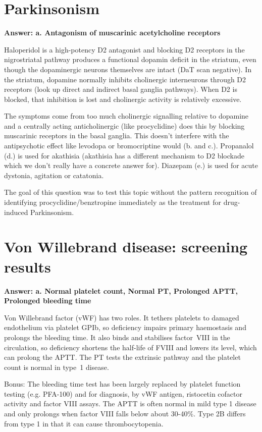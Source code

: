 \documentclass{article}
\begin{document}
\section{Parkinsonism}

\textbf{Answer: a. Antagonism of muscarinic acetylcholine receptors}

Haloperidol is a high-potency D2 antagonist and blocking D2 receptors in the nigrostriatal pathway produces a functional dopamin deficit in the striatum, even though the dopaminergic neurons themselves are intact (DaT scan negative). In the striatum, dopamine normally inhibits cholinergic interneurons through D2 receptors (look up direct and indirect basal ganglia pathways). When D2 is blocked, that inhibition is lost and cholinergic activity is relatively excessive. 

The symptoms come from too much cholinergic signalling relative to dopamine and a centrally acting anticholinergic (like procyclidine) does this by blocking muscarinic receptors in the basal ganglia. This doesn't interfere with the antipsychotic effect like levodopa or bromocriptine would (b. and c.). Propanalol (d.) is used for akathisia (akathisia has a different mechanism to D2 blockade which we don't really have a concrete answer for). Diazepam (e.) is used for acute dystonia, agitation or catatonia. 

The goal of this question was to test this topic without the pattern recognition of identifying procyclidine/benztropine immediately as the treatment for drug-induced Parkinsonism. 

\section{Von Willebrand disease: screening results}

\textbf{Answer: a. Normal platelet count, Normal PT, Prolonged APTT, Prolonged bleeding time}

Von Willebrand factor (vWF) has two roles. It tethers platelets to damaged endothelium via platelet GPIb, so deficiency impairs primary haemostasis and prolongs the bleeding time. It also binds and stabilises factor~VIII in the circulation, so deficiency shortens the half-life of FVIII and lowers its
level, which can prolong the APTT. The PT tests the extrinsic pathway and the platelet count is normal in type~1 disease.

Bonus: The bleeding time test has been largely replaced by platelet function testing (e.g. PFA-100) and for diagnosis, by vWF antigen, ristocetin cofactor activity and factor VIII assays. The APTT is often normal in mild type 1 disease and only prolongs when factor VIII falls below about 30-40\%. Type 2B differs from type 1 in that it can cause thrombocytopenia. 
\end{document}
